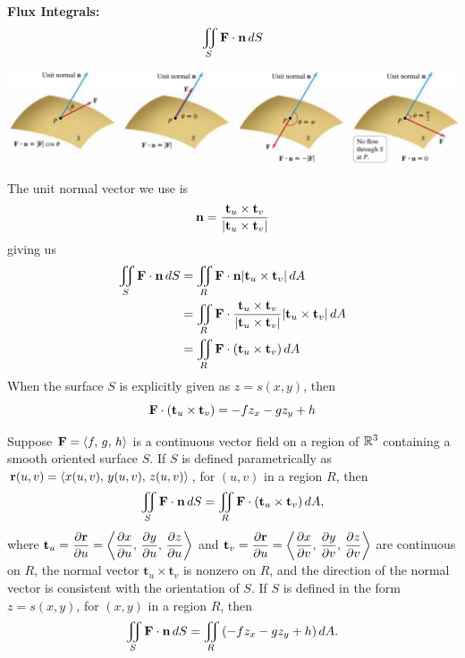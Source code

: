 \documentclass[mathNotesPreamble]{subfiles}
\begin{document}
  \textbf{Flux Integrals:}
    \[\iint\limits_S \mathbf F\cdot{\mathbf{n}}\,dS\]
  \begin{center}
    \includegraphics[width=0.95\linewidth]{images/briggs_17_06/fig17_57}
  \end{center}
  The unit normal vector we use is
    \[{\mathbf{n}}=\frac{\mathbf t_u\times\mathbf t_v}{{\left\vert\mathbf t_u\times\mathbf t_v\right\vert}}\]
  giving us
    \begin{align*}
      \iint\limits_S \mathbf F\cdot{\mathbf{n}}\,dS&= \iint\limits_R \mathbf F\cdot{\mathbf{n}} {\left\vert\mathbf t_u\times\mathbf t_v\right\vert}\,dA\\
      &= \iint\limits_R \mathbf F\cdot\frac{\mathbf t_u\times\mathbf t_v}{{\left\vert\mathbf t_u\times\mathbf t_v\right\vert}} {\left\vert\mathbf t_u\times\mathbf t_v\right\vert}\,dA\\
      &= \iint\limits_R \mathbf F\cdot{\left(\mathbf t_u\times\mathbf t_v\right)}\,dA
    \end{align*}
  When the surface $S$ is explicitly given as $z=s(x,y)$, then 
    \[\mathbf F\cdot{\left(\mathbf t_u\times\mathbf t_v\right)}=-fz_x-gz_y+h\]
  \pagebreak

  \begin{defn*}
    Suppose $\mathbf F={\left\langle f,\,g,\,h \right\rangle}$ is a continuous vector field on a region of $\mathbb{R}^3$ containing a smooth oriented surface $S$. If $S$ is defined parametrically as ${\mathbf{r}}(u,v)={\left\langle x(u,v),\,y(u,v),\,z(u,v) \right\rangle}$, for $(u,v)$ in a region $R$, then
      \[\iint\limits_S \mathbf F\cdot{\mathbf{n}}\,dS=\iint\limits_R \mathbf F\cdot{\left(\mathbf t_u\times\mathbf t_v\right)}\,dA,\]
    where $\displaystyle\mathbf t_u=\frac{\partial {\mathbf{r}}}{\partial u}={\left\langle \frac{\partial x}{\partial u},\,\frac{\partial y}{\partial u},\,\frac{\partial z}{\partial u} \right\rangle}$ and $\displaystyle\mathbf t_v=\frac{\partial {\mathbf{r}}}{\partial u}={\left\langle \frac{\partial x}{\partial v},\,\frac{\partial y}{\partial v},\,\frac{\partial z}{\partial v} \right\rangle}$ are continuous on $R$, the normal vector $\mathbf t_u\times\mathbf t_v$ is nonzero on $R$, and the direction of the normal vector is consistent with the orientation of $S$. If $S$ is defined in the form $z=s(x,y)$, for $(x,y)$ in a region $R$, then
      \[\iint\limits_S \mathbf F\cdot{\mathbf{n}}\,dS=\iint\limits_R {\left(-fz_x-gz_y+h\right)}\,dA.\]
  \end{defn*}
  \pagebreak
\end{document}
